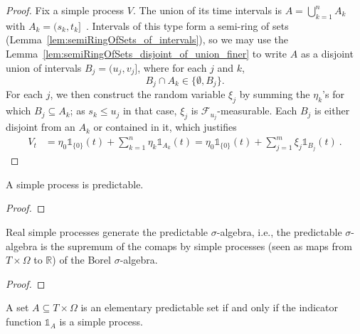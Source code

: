 \begin{proof}
  Fix a simple process $V$.
  The union of its time intervals is $A=\bigcup_{k=1}^n A_k$ with $A_k = (s_k, t_k]$~.
  Intervals of this type form a semi-ring of sets
  (Lemma~\ref{lem:semiRingOfSets_of_intervals}),
  so we may use the Lemma~\ref{lem:semiRingOfSets_disjoint_of_union_finer}
  to write $A$ as a disjoint union of intervals $B_j=(u_j, v_j]$,
  where for each $j$ and $k$,
  \[
  B_j \cap A_k \in \{\emptyset, B_j\}.
    \]
  For each $j$, we then construct the random variable $\xi_j$
  by summing the $\eta_k$'s for which $B_j \subseteq A_k$;
  as $s_k\le u_j$ in that case, $\xi_j$ is $\mathcal{F}_{u_j}$-measurable.
  Each $B_j$ is either disjoint from an $A_k$ or contained in it, which justifies
  \begin{align*}
    V_t
    &= \eta_0 \mathbb{1}_{\{0\}}(t) + \sum_{k=1}^{n} \eta_k \mathbb{1}_{A_k}(t)
    = \eta_0 \mathbb{1}_{\{0\}}(t) + \sum_{j=1}^{m} \xi_j \mathbb{1}_{B_j}(t)
    \: .
  \end{align*}
\end{proof}

\begin{lemma}\label{lem:predictable_simpleProcess}
  \leanok
A simple process is predictable.
\end{lemma}

\begin{proof}
  \leanok
\end{proof}


\begin{lemma}\label{lem:iSup_comap_simpleProcess}
  \leanok
Real simple processes generate the predictable $\sigma$-algebra, i.e., the predictable $\sigma$-algebra is the supremum of the comaps by simple processes (seen as maps from $T \times \Omega$ to $\mathbb{R}$) of the Borel $\sigma$-algebra.
\end{lemma}

\begin{proof}
  \leanok
\end{proof}


\begin{lemma}\label{lem:elementaryPredictableSet_iff_indicator}
  \leanok
A set $A \subseteq T \times \Omega$ is an elementary predictable set if and only if the indicator function $\mathbb{1}_A$ is a simple process.
\end{lemma}

